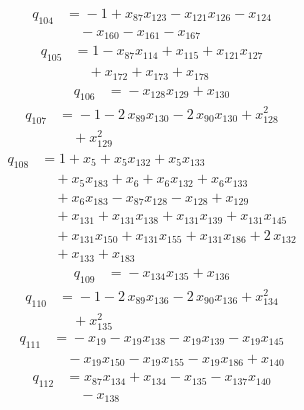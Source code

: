 \documentclass[11pt]{article}
\theoremstyle{remark}\newtheorem{remark}[theorem]{Remark}
\begin{document}
\begin{align*}
q_{104} &={}-1 +x_{87}x_{123} -x_{121}x_{126} -x_{124}\\
&\quad -x_{160} -x_{161} -x_{167}
\end{align*}
\begin{align*}
q_{105} &={}1 -x_{87}x_{114} +x_{115} +x_{121}x_{127}\\
&\quad +x_{172} +x_{173} +x_{178}
\end{align*}
\begin{align*}
q_{106} &={}-x_{128}x_{129} +x_{130}
\end{align*}
\begin{align*}
q_{107} &={}-1 -2\,x_{89}x_{130} -2\,x_{90}x_{130} +x_{128}^{2}\\
&\quad +x_{129}^{2}
\end{align*}
\begin{align*}
q_{108} &={}1 +x_{5} +x_{5}x_{132} +x_{5}x_{133}\\
&\quad +x_{5}x_{183} +x_{6} +x_{6}x_{132} +x_{6}x_{133}\\
&\quad +x_{6}x_{183} -x_{87}x_{128} -x_{128} +x_{129}\\
&\quad +x_{131} +x_{131}x_{138} +x_{131}x_{139} +x_{131}x_{145}\\
&\quad +x_{131}x_{150} +x_{131}x_{155} +x_{131}x_{186} +2\,x_{132}\\
&\quad +x_{133} +x_{183}
\end{align*}
\begin{align*}
q_{109} &={}-x_{134}x_{135} +x_{136}
\end{align*}
\begin{align*}
q_{110} &={}-1 -2\,x_{89}x_{136} -2\,x_{90}x_{136} +x_{134}^{2}\\
&\quad +x_{135}^{2}
\end{align*}
\begin{align*}
q_{111} &={}-x_{19} -x_{19}x_{138} -x_{19}x_{139} -x_{19}x_{145}\\
&\quad -x_{19}x_{150} -x_{19}x_{155} -x_{19}x_{186} +x_{140}
\end{align*}
\begin{align*}
q_{112} &={}x_{87}x_{134} +x_{134} -x_{135} -x_{137}x_{140}\\
&\quad -x_{138}
\end{align*}
\end{document}
